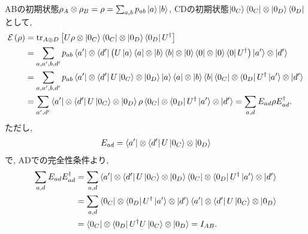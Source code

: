 \begin{ex}
    \label{ex8.3}
    ABの初期状態$\rho_A \otimes \rho_B = \rho =
        \sum_{a,b} p_{ab} \ket{a} \ket{b}$,
    CDの初期状態$\ket{0_C}\bra{0_C} \otimes \ket{0_D}\bra{0_D}$
    として,
    \begin{align*}
        \mathcal{E}\left(\rho\right)
         & =
        \mathrm{tr}_{A \otimes D}
        \left[
            U \rho \otimes \ket{0_C}\bra{0_C} \otimes \ket{0_D}\bra{0_D} U^\dagger
            \right]
        \\
         & =
        \sum_{a,a', b, d'}
        p_{ab}
        \bra{a'} \otimes \bra{d'}
        \left(
        U \ket{a} \bra{a} \otimes \ket{b}\bra{b} \otimes \ket{0}\bra{0} \otimes \ket{0}\bra{0} U^\dagger
        \right)
        \ket{a'} \otimes \ket{d'}
        \\
         & =
        \sum_{a,a', b, d'}
        p_{ab}
        \bra{a'} \otimes \bra{d'}
        U
        \ket{0_C} \otimes \ket{0_D}
        \ket{a}\bra{a} \otimes \ket{b}\bra{b}
        \bra{0_C} \otimes \bra{0_D}
        U^\dagger
        \ket{a'} \otimes \ket{d'}
        \\
         & =
        \sum_{a',d'}
        \bra{a'} \otimes \bra{d'}
        U
        \ket{0_C} \otimes \ket{0_D}
        \rho
        \bra{0_C} \otimes \bra{0_D}
        U^\dagger
        \ket{a'} \otimes \ket{d'} =
        \sum_{a,d}
        E_{ad}
        \rho
        E_{ad}^\dagger.
    \end{align*}
    ただし,
    \begin{align*}
        E_{ad} = \bra{a'} \otimes \bra{d'}
        U
        \ket{0_C} \otimes \ket{0_D}
    \end{align*}
    で, ADでの完全性条件より,
    \begin{align*}
        \sum_{a,d}
        E_{ad}
        E_{ad}^\dagger
         & =
        \sum_{a,d}
        \bra{a'} \otimes \bra{d'}
        U
        \ket{0_C} \otimes \ket{0_D}
        \bra{0_C} \otimes \bra{0_D}
        U^\dagger
        \ket{a'} \otimes \ket{d'}
        \\
         & =
        \sum_{a,d}
        \bra{0_C} \otimes \bra{0_D}
        U^\dagger
        \ket{a'} \otimes \ket{d'}
        \bra{a'} \otimes \bra{d'}
        U
        \ket{0_C} \otimes \ket{0_D}
        \\
         & =
        \bra{0_C} \otimes \bra{0_D}
        U^\dagger
        U
        \ket{0_C} \otimes \ket{0_D} = I_{AB}.
    \end{align*}
\end{ex}

